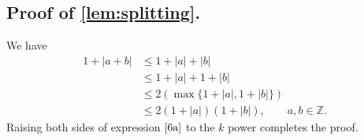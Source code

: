 \documentclass[12pt,reqno]{amsart}
\numberwithin{equation}{section}  %
\numberwithin{figure}{section}
\newcommand{\zz}{\mathbb{Z}}
\theoremstyle{plain}
\theoremstyle{definition}
\theoremstyle{remark}
\begin{document}
\subsection{Proof of \autoref{lem:splitting}.} We have
%
%
\begin{equation}
	\label{6a}
	\begin{split}
		1 + | a + b | 
		& \le 1 + | a | + | b | 
		\\
		& \le 1 + | a | + 1 + | b | 
		\\
		& \le 2\left( \max\{1+| a |, 1+| b | \}\right)
		\\
		& \le 2 \left( 1 + | a | \right)\left( 1 + | b | \right), \qquad a, b \in {\zz}.
	\end{split}
\end{equation}
%
%
Raising both sides of expression $\eqref{6a}$ to the $k$ power completes 
the proof. \qquad \qedsymbol 
\end{document}
